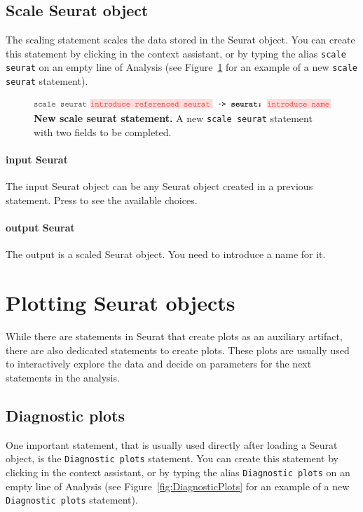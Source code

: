 \subsection{Scale Seurat object}
The scaling statement scales the data stored in the Seurat object.
You can create this statement by clicking  in the context assistant,
or by typing the alias \texttt{scale seurat} on an empty line of Analysis (see Figure~\ref{fig:ScaleSeurat}
for an example of a new \texttt{scale seurat} statement).

\begin{figure}[h!tbp]
  \centering
  \includegraphics[width=\figWidthWide]{figures/ScaleSeurat.pdf}
    \caption[New scale seurat statement.]{\textbf{New scale seurat statement.}
    A new \texttt{scale seurat} statement with two fields to be completed.}
\label{fig:ScaleSeurat}
\end{figure}

\paragraph{input Seurat}
The input Seurat object can be any Seurat object created in a previous statement. Press
\keys{\ctrl+\space} to see the available choices.

\paragraph{output Seurat}
The output is a scaled Seurat object. You need to introduce a name for it.

\section{Plotting Seurat objects}
While there are statements in Seurat that create plots as an auxiliary artifact,
there are also dedicated statements to create plots. These plots are
usually used to interactively explore the data and decide on parameters for the next
statements in the analysis.

\subsection{Diagnostic plots}\label{subsec:DiagnosticPlots}
One important statement, that is usually used directly after loading a Seurat object, is the
\texttt{Diagnostic plots} statement. You can create this statement by clicking
 in the context assistant, or by typing
the alias \texttt{Diagnostic plots} on an empty line of Analysis (see Figure~\ref{fig:DiagnosticPlots}
for an example of a new \texttt{Diagnostic plots} statement).

